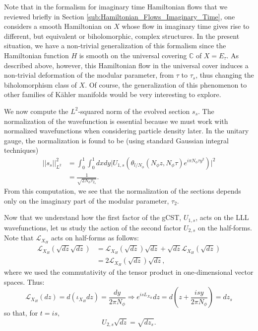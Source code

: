 \documentclass[a4paper,11pt]{article}
\newcommand{\C}{\mathbb{C}}
\begin{document}
Note that in the formalism for imaginary time Hamiltonian flows that we reviewed briefly in Section \ref{sub:Hamiltonian_Flows_Imaginary_Time}, one considers a smooth Hamiltonian on $X$ whose flow in imaginary time gives rise to different, but equivalent or biholomorphic, complex structures. In the present situation, we have a non-trivial generalization of this formalism since the Hamiltonian function $H$ is smooth on the universal covering $\C$ of $X=E_\tau$. As described above, however, this Hamiltonian flow in the universal cover induces a non-trivial deformation of the modular parameter, from $\tau$ to $\tau_s$, thus changing the biholomorphism class of $X$. Of course, the generalization of this phenomenon to other families of K\"ahler manifolds would be very interesting to explore.

We now compute the $L^2$-squared norm of the evolved section $s_{s}$. The normalization of the wavefunction is essential because we must work with normalized wavefunctions when considering particle density later. In the unitary gauge, the normalization is found to be (using standard Gaussian integral techniques)
\begin{align}
||s_{s}||^2_{L^2} &= \int_{0}^{1}\int_{0}^{1}dxdy \Big|U_{1,s}(\theta_{l/N_{\phi}}(N_{\phi}z,N_{\phi}\tau)e^{i\pi N_{\phi}\tau y^2})\Big|^2 \nonumber\\
&= \frac{1}{\sqrt{2N_{\phi}\tau_{2_s}}}.
\label{eq:normalizationunitary}
\end{align}
From this computation, we see that the normalization of the sections depends only on the imaginary part of the modular parameter, $\tau_{2}$. 

Now that we understand how the first factor of the gCST, $U_{1,s}$, acts on the LLL wavefunctions, let us study the action of the second factor $U_{2,s}$ on the half-forms. Note that $\mathcal{L}_{X_{H}}$ acts on half-forms as follows:
\begin{align*}
    \mathcal{L}_{X_{H}}(\sqrt{dz}\sqrt{dz}) &=  \mathcal{L}_{X_{H}}(\sqrt{dz})\sqrt{dz} + \sqrt{dz}\mathcal{L}_{X_{H}}(\sqrt{dz})\\
    &= 2\mathcal{L}_{X_{H}}(\sqrt{dz})\sqrt{dz},
\end{align*}
where we used the commutativity of the tensor product in one-dimensional vector spaces. Thus:
\begin{equation}
\mathcal{L}_{X_{H}}(dz) = d(\iota_{X_{H}}dz) = \frac{dy}{2\pi N_{\phi}} \Rightarrow e^{isL_{X_H}}dz = d\left(z+\frac{isy}{2\pi N_{\phi}}\right)= dz_{s}
\label{evolutionhalfform}
\end{equation}
so that, for $t=is,$
\begin{equation}
 U_{2,s} \sqrt{dz} = \sqrt{dz_{s}}.
 \label{halfformevolution}
\end{equation}
\end{document}
